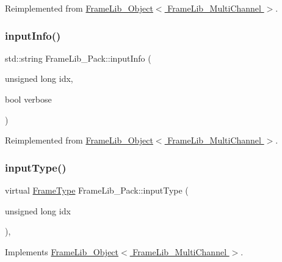 Reimplemented from \hyperlink{class_frame_lib___object_aaebb53211e0617e9203d1088c2fcb9c2}{Frame\+Lib\+\_\+\+Object$<$ Frame\+Lib\+\_\+\+Multi\+Channel $>$}.

\mbox{\label{class_frame_lib___pack_ae9dacf16825332c2227cd9fd9af9db1d}} 
\subsubsection{\texorpdfstring{input\+Info()}{inputInfo()}}
{\footnotesize\ttfamily std\+::string Frame\+Lib\+\_\+\+Pack\+::input\+Info (\begin{DoxyParamCaption}\item[{unsigned long}]{idx,  }\item[{bool}]{verbose }\end{DoxyParamCaption})\hspace{0.3cm}{\ttfamily [virtual]}}



Reimplemented from \hyperlink{class_frame_lib___object_a49abea5f18125c425b1eae8710735891}{Frame\+Lib\+\_\+\+Object$<$ Frame\+Lib\+\_\+\+Multi\+Channel $>$}.

\mbox{\label{class_frame_lib___pack_aba6a4e0ebdf5c40134f39f03cae80b29}} 
\subsubsection{\texorpdfstring{input\+Type()}{inputType()}}
{\footnotesize\ttfamily virtual \hyperlink{_frame_lib___types_8h_ad495a9f61af7fff07d7e97979d1ab854}{Frame\+Type} Frame\+Lib\+\_\+\+Pack\+::input\+Type (\begin{DoxyParamCaption}\item[{unsigned long}]{idx }\end{DoxyParamCaption})\hspace{0.3cm}{\ttfamily [inline]}, {\ttfamily [virtual]}}



Implements \hyperlink{class_frame_lib___object_a6c5d94f1577471d33204078e86f51ff3}{Frame\+Lib\+\_\+\+Object$<$ Frame\+Lib\+\_\+\+Multi\+Channel $>$}.

